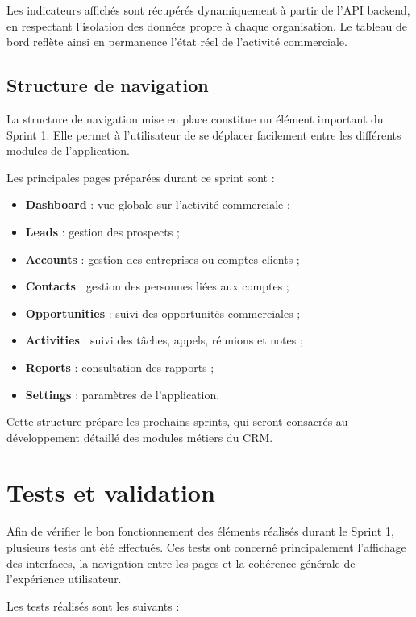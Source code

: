 \documentclass[12pt,a4paper,twoside,openany]{book}
\begin{document}
Les indicateurs affichés sont récupérés dynamiquement à partir de l’API backend, en respectant l’isolation des données propre à chaque organisation. Le tableau de bord reflète ainsi en permanence l’état réel de l’activité commerciale.

\subsection{Structure de navigation}

La structure de navigation mise en place constitue un élément important du Sprint 1. Elle permet à l’utilisateur de se déplacer facilement entre les différents modules de l’application.

Les principales pages préparées durant ce sprint sont :

\begin{itemize}
    \item \textbf{Dashboard} : vue globale sur l’activité commerciale ;
    \item \textbf{Leads} : gestion des prospects ;
    \item \textbf{Accounts} : gestion des entreprises ou comptes clients ;
    \item \textbf{Contacts} : gestion des personnes liées aux comptes ;
    \item \textbf{Opportunities} : suivi des opportunités commerciales ;
    \item \textbf{Activities} : suivi des tâches, appels, réunions et notes ;
    \item \textbf{Reports} : consultation des rapports ;
    \item \textbf{Settings} : paramètres de l’application.
\end{itemize}

Cette structure prépare les prochains sprints, qui seront consacrés au développement détaillé des modules métiers du CRM.

\section{Tests et validation}

Afin de vérifier le bon fonctionnement des éléments réalisés durant le Sprint 1, plusieurs tests ont été effectués. Ces tests ont concerné principalement l’affichage des interfaces, la navigation entre les pages et la cohérence générale de l’expérience utilisateur.

Les tests réalisés sont les suivants :
\end{document}
